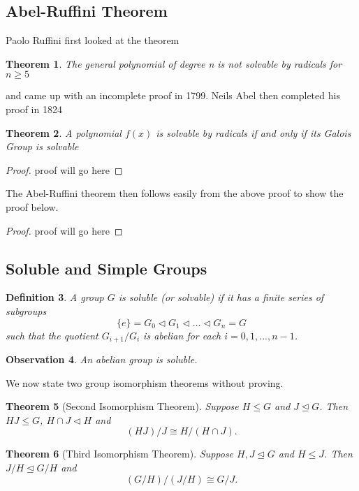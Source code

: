 \documentclass[12pt]{article}
\newtheorem{theorem}{Theorem}
\newtheorem{definition}[theorem]{Definition}
\newtheorem{observation}[theorem]{\textbf{Observation}}
\begin{document}
\subsection{Abel-Ruffini Theorem}

Paolo Ruffini first looked at the theorem

\begin{theorem}
    The general polynomial of degree n is not solvable
by radicals for $n \ge 5$
\end{theorem}

and came up with an incomplete proof in 1799. Neils Abel then completed his proof in 1824

\begin{theorem}
    A polynomial $f(x)$ is solvable by radicals if and only if its Galois Group is solvable
\end{theorem}

\begin{proof}
    proof will go here
\end{proof}

The Abel-Ruffini theorem then follows easily from the above proof to show the proof below.

\begin{proof}
proof will go here    
\end{proof}


\subsection{Soluble and Simple Groups}

\begin{definition} \label{def:soluble}
    A group $G$ is soluble (or solvable) if it has a finite series of subgroups 
    $$ \{ e \} = G_0 \triangleleft G_1 \triangleleft \dots \triangleleft G_n = G$$
    such that the quotient $G_{i+1} / G_{i}$ is abelian for each $i = 0, 1, ...,  n - 1$.
\end{definition}

\begin{observation}
    An abelian group is soluble. 
\end{observation}

We now state two group isomorphism theorems without proving. 

\begin{theorem}[Second Isomorphism Theorem] \label{thm:second-iso}
    Suppose $H \le G$ and $J \trianglelefteq G$. Then $HJ \le G$, $H \cap J \triangleleft H$ and $$
    (HJ) / J \cong H / (H \cap J). 
    $$
\end{theorem}
\begin{theorem}[Third Isomorphism Theorem] \label{thm:third-iso}
    Suppose $H, J \trianglelefteq G$ and $H \le J$. Then $J/H \trianglelefteq G/H$ and $$
    (G/H)/(J/H) \cong G / J.    $$
\end{theorem}
\end{document}
